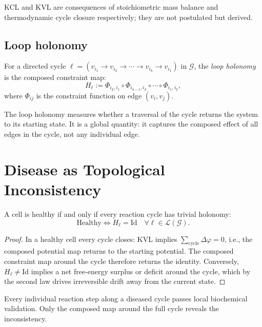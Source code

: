 \documentclass[twocolumn,11pt,a4paper]{article}
\newcommand{\Gcond}{\mathcal{G}}
\newcommand{\HolL}{H_\ell}
\begin{document}
KCL and KVL are consequences of stoichiometric mass balance and
thermodynamic cycle closure respectively; they are not postulated but derived.

\subsection{Loop holonomy}

\begin{definition}\label{def:holonomy}
For a directed cycle $\ell = (v_{i_1}\to v_{i_2}\to\cdots\to v_{i_k}
\to v_{i_1})$ in $\Gcond$, the \emph{loop holonomy} is the composed
constraint map:
\[
\HolL := \Phi_{i_k,i_1}\circ\Phi_{i_{k-1},i_k}\circ\cdots\circ\Phi_{i_1,i_2},
\]
where $\Phi_{ij}$ is the constraint function on edge $(v_i, v_j)$.
\end{definition}

The loop holonomy measures whether a traversal of the cycle returns
the system to its starting state. It is a global quantity: it captures
the composed effect of all edges in the cycle, not any individual edge.

\section{Disease as Topological Inconsistency}
\label{sec:disease}

\begin{theorem}\label{thm:health-consistency}
A cell is healthy if and only if every reaction cycle has trivial holonomy:
\[
\text{Healthy} \iff \HolL = \mathrm{Id} \quad\forall \ell \in \mathcal{L}(\Gcond).
\]
\end{theorem}

\begin{proof}
In a healthy cell every cycle closes: KVL implies
$\sum_{\text{cycle}} \Delta\varphi = 0$, i.e., the composed potential map
returns to the starting potential. The composed constraint map around the
cycle therefore returns the identity. Conversely, $\HolL \neq \mathrm{Id}$
implies a net free-energy surplus or deficit around the cycle, which by
the second law drives irreversible drift away from the current state.
\end{proof}

\begin{theorem}\label{thm:invisible}
Every individual reaction step along a diseased cycle passes local
biochemical validation. Only the composed map around the full cycle
reveals the inconsistency.
\end{theorem}
\end{document}
